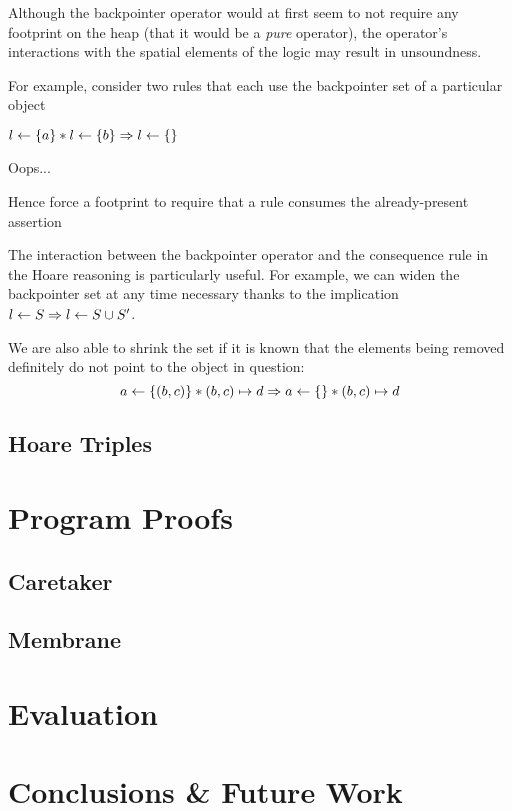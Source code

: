 \documentclass[a4paper,notitlepage]{report}
\begin{document}
Although the backpointer operator would at first seem to not require any
footprint on the heap (that it would be a \emph{pure} operator), the operator's
interactions with the spatial elements of the logic may result in unsoundness.

For example, consider two rules that each use the backpointer set of a
particular object

$l \leftarrow \{a\} \mathbin{*} l \leftarrow \{b\} \Rightarrow l \leftarrow \{\}$


Oops...

Hence force a footprint to require that a rule consumes the already-present
assertion

The interaction between the backpointer operator and the consequence rule in the
Hoare reasoning is particularly useful.
For example, we can widen the backpointer set at any time necessary thanks to
the implication $l \leftarrow S \Rightarrow l \leftarrow S \cup S'$.

We are also able to shrink the set if it is known that the elements being
removed definitely do not point to the object in question:
\[
  a \leftarrow \{(b,c)\} \mathbin{*} (b,c) \mapsto d \Rightarrow a \leftarrow \{\} \mathbin{*} (b,c) \mapsto d
\]

\section{Hoare Triples}

\chapter{Program Proofs}
\section{Caretaker}
\section{Membrane}

\chapter{Evaluation}
\chapter{Conclusions \& Future Work}
\end{document}
